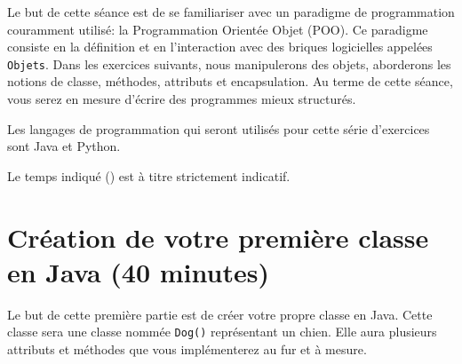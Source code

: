 




\ShowSolutiontrue
\ShowConseiltrue
\titre
{}

Le but de cette séance est de se familiariser avec un paradigme de programmation couramment utilisé: la Programmation Orientée Objet (POO). Ce paradigme consiste en la définition et en l'interaction avec des briques logicielles appelées \lstinline{Objets}. Dans les exercices suivants, nous manipulerons des objets, aborderons les notions de classe, méthodes, attributs et encapsulation. Au terme de cette séance, vous serez en mesure d'écrire des programmes mieux structurés.

Les langages de programmation qui seront utilisés pour cette série d'exercices sont Java et Python.

Le temps indiqué (\faClock) est à titre strictement indicatif.

\section{Création de votre première classe en Java (40 minutes)}

Le but de cette première partie est de créer votre propre classe en Java. Cette classe sera une classe nommée \lstinline{Dog()} représentant un chien. Elle aura plusieurs attributs et méthodes que vous implémenterez au fur et à mesure.
\\

